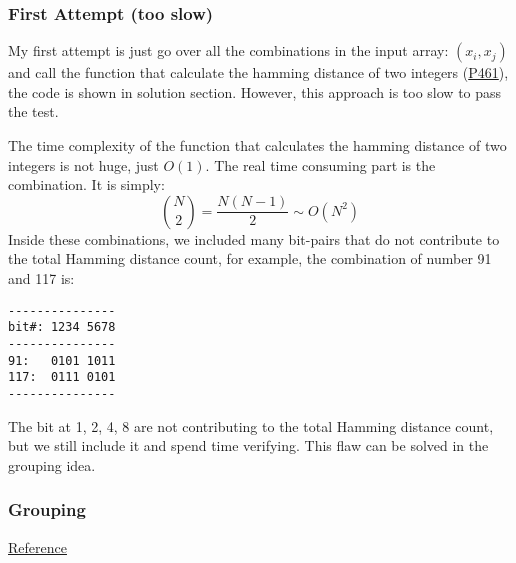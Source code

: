 \documentclass[12pt]{article}
\begin{document}
\subsubsection{First Attempt (too slow)}
\label{sec:org4bb6f6b}
My first attempt is just go over all the combinations in the input array: \((x_i, x_j)\) and call the function that calculate the hamming distance of two integers (\hyperref[orgbdf1f35]{P461}), the code is shown in solution section. However, this approach is too slow to pass the test.

The time complexity of the function that calculates the hamming distance of two integers is not huge, just \(O(1)\). The real time consuming part is the combination. It is simply:
\[
{N \choose 2} = \frac{N(N-1)}{2} \sim O(N^2)
\]
Inside these combinations, we included many bit-pairs that do not contribute to the total Hamming distance count, for example, the combination of number 91 and 117 is:
\begin{verbatim}
---------------
bit#: 1234 5678
---------------
91:   0101 1011
117:  0111 0101
---------------
\end{verbatim}
The bit at 1, 2, 4, 8 are not contributing to the total Hamming distance count, but we still include it and spend time verifying. This flaw can be solved in the grouping idea.

\subsubsection{Grouping}
\label{sec:org0ed9665}
\href{https://leetcode.com/problems/total-hamming-distance/discuss/96250/C++-O(n)-runtime-O(1)-space}{Reference}
\end{document}
